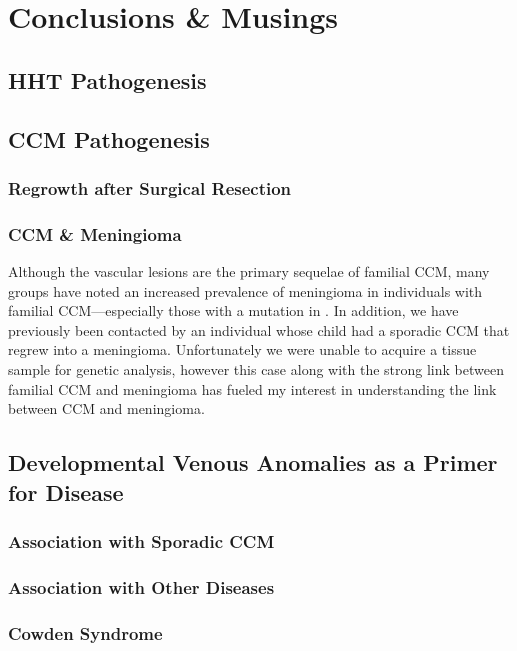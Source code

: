 \chapter{Conclusions \& Musings}

\section{HHT Pathogenesis}

\section{CCM Pathogenesis}
\subsection{Regrowth after Surgical Resection}
\subsection{CCM \& Meningioma}
Although the vascular lesions are the primary sequelae of familial CCM, many groups have noted an increased prevalence of meningioma in individuals with familial CCM—especially those with a mutation in  \citep{labauge2009, riant2013, garaci2015}. In addition, we have previously been contacted by an individual whose child had a sporadic CCM that regrew into a meningioma. Unfortunately we were unable to acquire a tissue sample for genetic analysis, however this case along with the strong link between familial CCM and meningioma has fueled my interest in understanding the link between CCM and meningioma. 
\subsubsection{}

\section{Developmental Venous Anomalies as a Primer for Disease}
\subsection{Association with Sporadic CCM}
\subsection{Association with Other Diseases}
\subsection{Cowden Syndrome}
